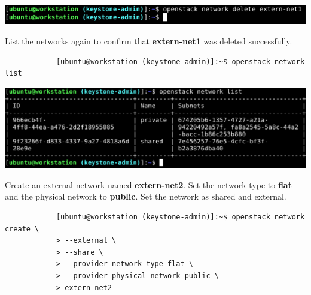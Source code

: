 \documentclass[letterpaper, 12pt]{article}
\begin{document}
\begin{enumerate}
\begin{labstep}
        \begin{center}
            \includegraphics[width=\linewidth]{images/part1/step13.png}
        \end{center}
    \end{labstep}

    \begin{labstep}
        List the networks again to confirm that \textbf{extern-net1} was deleted successfully.
        \begin{lstlisting}
            [ubuntu@workstation (keystone-admin)]:~$ openstack network list
        \end{lstlisting}

        \begin{center}
            \includegraphics[width=\linewidth]{images/part1/step14.png}
        \end{center}
    \end{labstep}

    \begin{labstep}
        Create an external network named \textbf{extern-net2}.
        Set the network type to \textbf{flat} and the physical network to \textbf{public}.
        Set the network as shared and external.
        \begin{lstlisting}
            [ubuntu@workstation (keystone-admin)]:~$ openstack network create \
            > --external \
            > --share \
            > --provider-network-type flat \
            > --provider-physical-network public \
            > extern-net2
        \end{lstlisting}


\end{labstep}
\end{enumerate}
\end{document}
